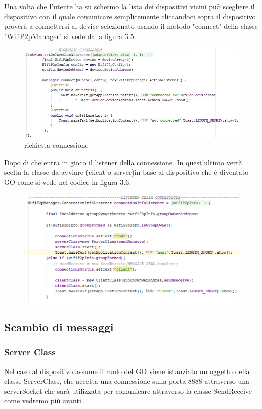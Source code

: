 Una volta che l'utente ha su schermo la lista dei dispositivi
vicini può scegliere il dispositivo con il quale comunicare
semplicemente cliccandoci sopra il dispositivo proverà a
connettersi al device selezionato usando il metodo "connect"
della classe "WifiP2pManager" si vede dalla figura 3.5.
\begin{figure}
   \caption{richiesta connessione}
   \includegraphics[width=1\columnwidth]{imgs/Connect.png}
\end{figure}

Dopo di che entra in gioco il listener della connessione.
In quest'ultimo verrà scelta la classe da avviare
(client o server)in base al dispositivo che è
diventato GO come si vede nel codice in figura 3.6.

\begin{figure}
   \caption{}
   \includegraphics[width=1\columnwidth]{imgs/listenerConeessione.png}
\end{figure}

\subsection{Scambio di messaggi}
\subsubsection{Server Class}
Nel caso al dispositivo assume il ruolo del GO
viene istanziato un oggetto della  classe ServerClass,
che accetta una connessione sulla porta 8888
attraverso una serverSocket che sarà utilizzata per comunicare
attraverso la classe SendReceive come vedremo più avanti

